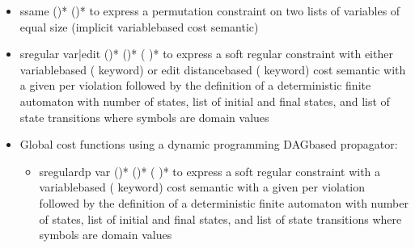 \documentclass[letterpaper,10pt,openany,oneside,english]{sphinxmanual}
\begin{document}
\begin{fulllineitems}
\begin{itemize}
\begin{itemize}
\item {} 
\sphinxAtStartPar
ssame    ()* ()* to express a permutation constraint on two lists of variables of equal size (implicit variable\sphinxhyphen{}based cost semantic)

\item {} 
\sphinxAtStartPar
sregular var|edit    ()*  ()*  (  )* to express a soft regular constraint with either variable\sphinxhyphen{}based ( keyword) or edit distance\sphinxhyphen{}based ( keyword) cost semantic with a given  per violation followed by the definition of a deterministic finite automaton with number of states, list of initial and final states, and list of state transitions where symbols are domain values

\end{itemize}


\end{itemize}


\sphinxAtStartPar
\begin{itemize}
\item {} 
\sphinxAtStartPar
Global cost functions using a dynamic programming DAG\sphinxhyphen{}based propagator:\begin{itemize}
\item {} 
\sphinxAtStartPar
sregulardp var    ()*  ()*  (  )* to express a soft regular constraint with a variable\sphinxhyphen{}based ( keyword) cost semantic with a given  per violation followed by the definition of a deterministic finite automaton with number of states, list of initial and final states, and list of state transitions where symbols are domain values


\end{itemize}
\end{itemize}
\end{fulllineitems}
\end{document}
